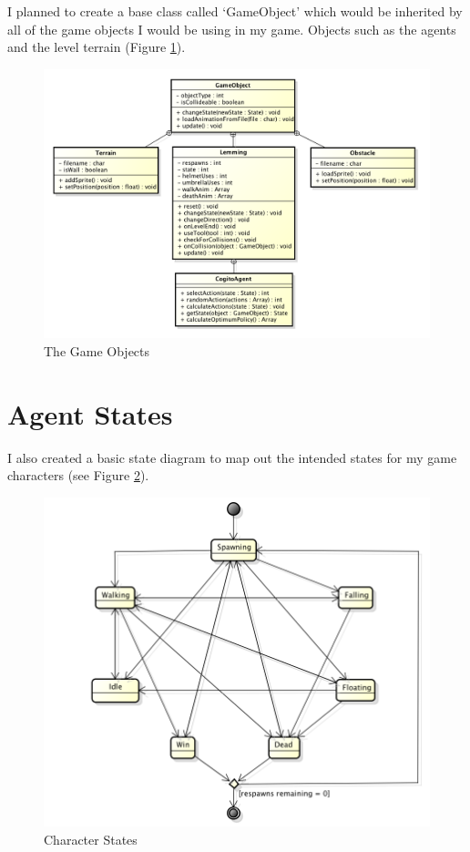 \documentclass[a4paper,oneside]{report}
\begin{document}
I planned to create a base class called `GameObject' which would be inherited by all of the game objects I would be using in my game. Objects such as the agents and the level terrain (Figure \ref{fig:GameObjects}).

\begin{figure}[h!]
  \centering
    \includegraphics[width=150mm]{sources/images/GameObjects}
    \caption{The Game Objects}
    \label{fig:GameObjects}
\end{figure}
	
\section{Agent States}

I also created a basic state diagram to map out the intended states for my game characters (see Figure \ref{fig:LemmingFSM}).

\begin{figure}[h!]
  \centering
    \includegraphics[width=130mm]{sources/images/LemmingStatemachine}
    \caption{Character States}
    \label{fig:LemmingFSM}
\end{figure}
	
\end{document}
